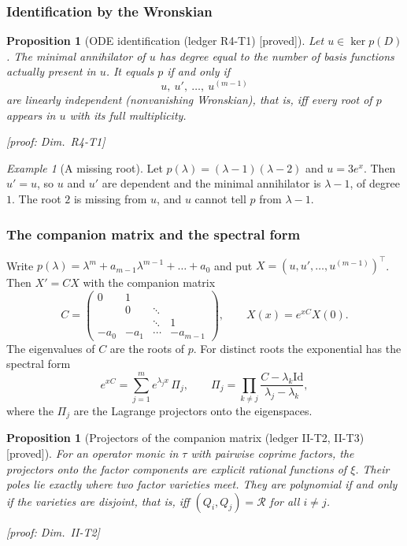 \documentclass[11pt]{article}
\theoremstyle{plain}
\newtheorem{proposition}[theorem]{Proposition}
\theoremstyle{definition}
\theoremstyle{remark}
\newtheorem{example}[theorem]{Example}
\newcommand{\ring}{\mathcal{R}}            %
\newcommand{\Id}{\mathrm{Id}}
\newcommand{\badge}[2]{\textcolor{#1}{\textsf{\footnotesize[#2]}}}
\newcommand{\proved}[1][]{\badge{cC}{proved#1}}
\newcommand{\led}[1]{\textcolor{cG}{\textsf{\footnotesize(ledger #1)}}}
\newcommand{\dimref}[1]{\textsf{\footnotesize[proof: Dim.~#1]}}
\begin{document}
\subsubsection{Identification by the Wronskian}

\begin{proposition}[{ODE identification \led{R4-T1} \proved}]\label{prop:ode-ident}
Let $u\in\ker p(D)$. The minimal annihilator of $u$ has degree equal to the number of basis functions actually present in $u$. It equals $p$ if and only if
\[
u,\ u',\ \dots,\ u^{(m-1)}
\]
are linearly independent (nonvanishing Wronskian), that is, iff every root of $p$ appears in $u$ with its full multiplicity.

\dimref{R4-T1}
\end{proposition}

\begin{example}[{A missing root}]
Let $p(\lambda)=(\lambda-1)(\lambda-2)$ and $u=3e^{x}$. Then $u'=u$, so $u$ and $u'$ are dependent and the minimal annihilator is $\lambda-1$, of degree $1$. The root $2$ is missing from $u$, and $u$ cannot tell $p$ from $\lambda-1$.
\end{example}

\subsubsection{The companion matrix and the spectral form}

Write $p(\lambda)=\lambda^m+a_{m-1}\lambda^{m-1}+\dots+a_0$ and put $X=(u,u',\dots,u^{(m-1)})^{\top}$. Then $X'=CX$ with the companion matrix
\[
C=\begin{pmatrix}0&1&&\\&0&\ddots&\\&&\ddots&1\\-a_0&-a_1&\cdots&-a_{m-1}\end{pmatrix},
\qquad X(x)=e^{xC}X(0).
\]
The eigenvalues of $C$ are the roots of $p$. For distinct roots the exponential has the spectral form
\begin{equation}\label{f:eq:spectral}
e^{xC}=\sum_{j=1}^me^{\lambda_jx}\,\Pi_j,\qquad
\Pi_j=\prod_{k\ne j}\frac{C-\lambda_k\Id}{\lambda_j-\lambda_k},
\end{equation}
where the $\Pi_j$ are the Lagrange projectors onto the eigenspaces.

\begin{proposition}[{Projectors of the companion matrix \led{II-T2, II-T3} \proved}]\label{prop:proj}
For an operator monic in $\tau$ with pairwise coprime factors, the projectors onto the factor components are explicit rational functions of $\xi$. Their poles lie exactly where two factor varieties meet. They are polynomial if and only if the varieties are disjoint, that is, iff $(Q_i,Q_j)=\ring$ for all $i\ne j$.

\dimref{II-T2}
\end{proposition}
\end{document}
